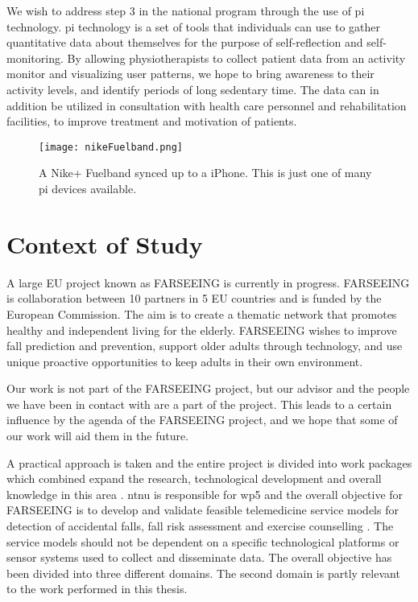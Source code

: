We wish to address step 3 in the national program through the use of \gls{pi} technology. \gls{pi} technology is a set of tools that individuals can use to gather quantitative data about themselves for the purpose of self-reflection and self-monitoring. By allowing physiotherapists to collect patient data from an activity monitor and visualizing user patterns, we hope to bring awareness to their activity levels, and identify periods of long sedentary time. The data can in addition be utilized in consultation with health care personnel and rehabilitation facilities, to improve treatment and motivation of patients.


\begin{figure}[h!]
	\centering
		\texttt{[image: nikeFuelband.png]}
		\caption{\footnotesize A Nike+ Fuelband synced up to a iPhone. This is just one of many \gls{pi} devices available.}
		\label{fig:nikeFuelbandPhone}
\end{figure}

\section{Context of Study}
A large EU project known as FARSEEING is currently in progress. FARSEEING is collaboration between 10 partners in 5 EU countries and is funded by the European Commission. The aim is to create a thematic network that promotes healthy and independent living for the elderly. FARSEEING wishes to improve fall prediction and prevention, support older adults through technology, and use unique proactive opportunities to keep adults in their own environment.

Our work is not part of the FARSEEING project, but our advisor and the people we have been in contact with are a part of the project. This leads to a certain influence by the agenda of the FARSEEING project, and we hope that some of our work will aid them in the future.

A practical approach is taken and the entire project is divided into work packages which combined expand the research, technological development and overall knowledge in this area \cite{farseeing}. \gls{ntnu} is responsible for \gls{wp5} and the overall objective for FARSEEING is to develop and validate feasible telemedicine service models for detection of accidental falls, fall risk assessment and exercise counselling \cite{wp5}. The service models should not be dependent on a specific technological platforms or sensor systems used to collect and disseminate data. The overall objective has been divided into three different domains. The second domain is partly relevant to the work performed in this thesis.

